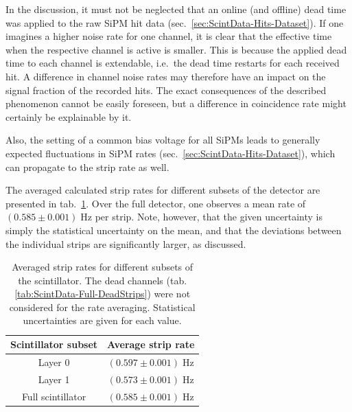 \par In the discussion, it must not be neglected that an online (and offline) dead time was applied to the raw \ac{SiPM} hit data (sec.\ \ref{sec:ScintData-Hits-Dataset}). If one imagines a higher noise rate for one channel, it is clear that the effective time when the respective channel is active is smaller. This is because the applied dead time to each channel is extendable, i.e.\ the dead time restarts for each received hit. A difference in channel noise rates may therefore have an impact on the signal fraction of the recorded hits. The exact consequences of the described phenomenon cannot be easily foreseen, but a difference in coincidence rate might certainly be explainable by it.
\par Also, the setting of a common bias voltage for all \acp{SiPM} leads to generally expected fluctuations in \ac{SiPM} rates (sec.\ \ref{sec:ScintData-Hits-Dataset}), which can propagate to the strip rate as well.
\par The averaged calculated strip rates for different subsets of the detector are presented in tab.\ \ref{tab:ScintData-Full-StripRates}. Over the full detector, one observes a mean rate of $(0.585 \pm 0.001)\;\si{\hertz}$ per strip. Note, however, that the given uncertainty is simply the statistical uncertainty on the mean, and that the deviations between the individual strips are significantly larger, as discussed.
\begin{table}[htb]
    \centering
    \begin{tabular}{|c|c|}  %
        \hline
        Scintillator subset & Average strip rate \\ \hline
        Layer 0 & $(0.597\pm 0.001)\;\si{\hertz}$ \\
        Layer 1 & $(0.573 \pm 0.001)\;\si{\hertz}$ \\
        Full scintillator & $(0.585 \pm 0.001)\;\si{\hertz}$ \\ \hline
    \end{tabular}
    \caption{Averaged strip rates for different subsets of the scintillator. The dead channels (tab. \ref{tab:ScintData-Full-DeadStrips}) were not considered for the rate averaging. Statistical uncertainties are given for each value.}
    \label{tab:ScintData-Full-StripRates}
\end{table}
